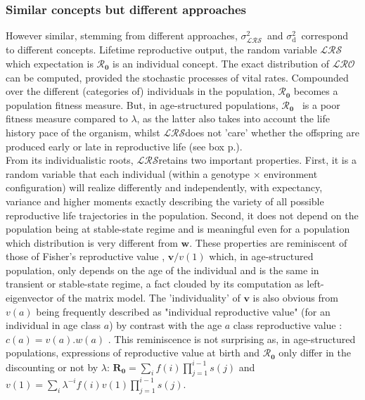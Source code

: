 \documentclass[10pt,a4paper]{article}
\newcommand{\lam}{$\lambda$}
\newcommand{\Rzero}{$\boldsymbol{\mathcal{R}_{0}}$  }
\newcommand{\LRO}{$\mathcal{LRS}$}
\newcommand{\vLRO}{$\sigma_{\mathrm{\mathcal{LRS}}}^2$}
\newcommand{\vd}{$\sigma_{\mathrm{d}}^2$}
\begin{document}
\subsubsection*{Similar concepts but different approaches}
However similar, stemming from different approaches, \vLRO\ and \vd\ correspond to different concepts.  
Lifetime reproductive output, the random variable \LRO which expectation is \Rzero is an individual concept. The exact distribution of $\mathcal{LRO}$ can be computed, provided the stochastic processes of vital rates. Compounded over the different (categories of) individuals in the population, \Rzero becomes a population fitness measure. But, in age-structured populations, \Rzero\ is a poor fitness measure compared to \lam, as the latter also takes into account the life history pace of the organism, whilst \LRO does not 'care' whether the offspring are produced early or late in reproductive life (see box p.\pageref{box:noteonR0}).\\

From its individualistic roots, \LRO retains two important properties. First, it is a random variable that each individual (within a genotype $\times$ environment configuration) will realize differently and independently, with expectancy, variance and higher moments exactly describing the variety of all possible reproductive life trajectories in the population. Second, it does not depend on the population being at stable-state regime and is meaningful even for a population which distribution is very different from $\bm{w}$.
These properties are reminiscent of those of Fisher's reproductive value \citep{Fisher1930}, ${\bm{v}}/{v(1)}$ which, in age-structured population, only depends on the age of the individual and is the same in transient or stable-state regime, a fact clouded by its computation as left-eigenvector of the matrix model. The 'individuality' of $\bm{v}$ is also obvious from $v(a)$ being frequently described as "individual reproductive value" (for an individual in age class $a$) by contrast with the age $a$ class reproductive value : $c(a)=v(a).w(a)$ \citep{Taylor1990,Taylor2007}. This reminiscence is not surprising as, in age-structured populations,  expressions of reproductive value at birth and \Rzero only differ in the discounting or not by \lam :  $\mathbf{R_{0}}=\sum_{i} f(i)\prod_{j=1}^{i-1} s(j)$ and $v(1)=\sum_{i} \lambda^{-i}f(i)v(1)\prod_{j=1}^{i-1} s(j)$.\\
\end{document}
